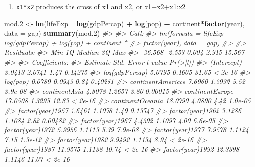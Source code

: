 \documentclass[]{book}
\newenvironment{Shaded}{\begin{snugshade}}{\end{snugshade}}
\newcommand{\CommentTok}[1]{\textcolor[rgb]{0.56,0.35,0.01}{\textit{#1}}}
\newcommand{\DataTypeTok}[1]{\textcolor[rgb]{0.13,0.29,0.53}{#1}}
\newcommand{\FloatTok}[1]{\textcolor[rgb]{0.00,0.00,0.81}{#1}}
\newcommand{\KeywordTok}[1]{\textcolor[rgb]{0.13,0.29,0.53}{\textbf{#1}}}
\newcommand{\NormalTok}[1]{#1}
\newcommand{\OperatorTok}[1]{\textcolor[rgb]{0.81,0.36,0.00}{\textbf{#1}}}
\newcommand{\StringTok}[1]{\textcolor[rgb]{0.31,0.60,0.02}{#1}}
\providecommand{\tightlist}{%
  \setlength{\itemsep}{0pt}\setlength{\parskip}{0pt}}
\begin{document}
\begin{enumerate}
\def\labelenumi{\arabic{enumi}.}
\setcounter{enumi}{1}
\tightlist
\item
  \texttt{x1*x2} produces the cross of x1 and x2, or x1+x2+x1:x2
\end{enumerate}

\begin{Shaded}
\begin{Highlighting}[]
\NormalTok{mod}\FloatTok{.2}\NormalTok{ <-}\StringTok{ }\KeywordTok{lm}\NormalTok{(lifeExp }\OperatorTok{~}\StringTok{ }\KeywordTok{log}\NormalTok{(gdpPercap) }\OperatorTok{+}\StringTok{ }\KeywordTok{log}\NormalTok{(pop) }\OperatorTok{+}\StringTok{ }\NormalTok{continent}\OperatorTok{*}\KeywordTok{factor}\NormalTok{(year), }\DataTypeTok{data =}\NormalTok{ gap)}
\KeywordTok{summary}\NormalTok{(mod}\FloatTok{.2}\NormalTok{)}
\CommentTok{#> }
\CommentTok{#> Call:}
\CommentTok{#> lm(formula = lifeExp ~ log(gdpPercap) + log(pop) + continent * }
\CommentTok{#>     factor(year), data = gap)}
\CommentTok{#> }
\CommentTok{#> Residuals:}
\CommentTok{#>     Min      1Q  Median      3Q     Max }
\CommentTok{#> -26.568  -2.553   0.004   2.915  15.567 }
\CommentTok{#> }
\CommentTok{#> Coefficients:}
\CommentTok{#>                                    Estimate Std. Error t value Pr(>|t|)}
\CommentTok{#> (Intercept)                          3.0413     2.0741    1.47  0.14275}
\CommentTok{#> log(gdpPercap)                       5.0795     0.1605   31.65  < 2e-16}
\CommentTok{#> log(pop)                             0.0789     0.0943    0.84  0.40251}
\CommentTok{#> continentAmericas                    7.6960     1.3932    5.52  3.9e-08}
\CommentTok{#> continentAsia                        4.8078     1.2657    3.80  0.00015}
\CommentTok{#> continentEurope                     17.0508     1.3295   12.83  < 2e-16}
\CommentTok{#> continentOceania                    18.0790     4.0890    4.42  1.0e-05}
\CommentTok{#> factor(year)1957                     1.6461     1.1078    1.49  0.13747}
\CommentTok{#> factor(year)1962                     3.1286     1.1084    2.82  0.00482}
\CommentTok{#> factor(year)1967                     4.4392     1.1097    4.00  6.6e-05}
\CommentTok{#> factor(year)1972                     5.9956     1.1113    5.39  7.9e-08}
\CommentTok{#> factor(year)1977                     7.9578     1.1124    7.15  1.3e-12}
\CommentTok{#> factor(year)1982                     9.9492     1.1134    8.94  < 2e-16}
\CommentTok{#> factor(year)1987                    11.9575     1.1138   10.74  < 2e-16}
\CommentTok{#> factor(year)1992                    12.3398     1.1146   11.07  < 2e-16}

\end{Highlighting}
\end{Shaded}
\end{document}
